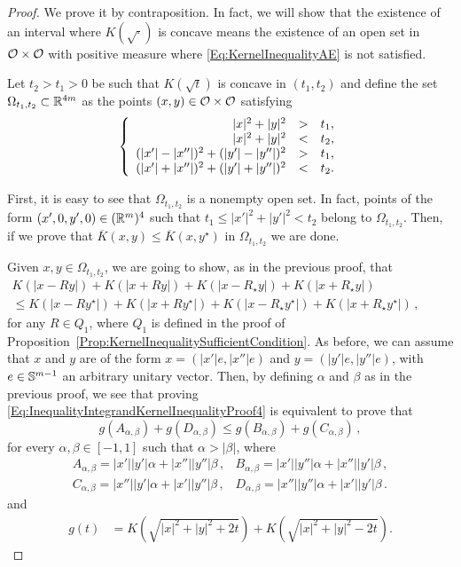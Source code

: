 \begin{proof}
We prove it by contraposition. In fact, we will show that the existence of an interval where $K(\sqrt{\cdot})$ is concave means the existence of an open set in $\mathcal{O} \times \mathcal{O}$ with positive measure where \eqref{Eq:KernelInequalityAE} is not satisfied.

Let $t_2>t_1>0$ be such that $K(\sqrt{t})$ is concave in $(t_1,t_2)$ and define the set $\Omega_{t_1,t_2}\subset \mathbb{R}^{4m}$ as the points $(x,y)\in \mathcal{O}\times \mathcal{O}$ satisfying
\begin{equation}
\label{eq:OmegaSetDefinition}
\left\{\begin{array}{rcll}
|x|^2+|y|^2&>&t_1,\\
|x|^2+|y|^2&<&t_2,\\
(|x'|-|x''|)^2+(|y'|-|y''|)^2&>&t_1,\\
(|x'|+|x''|)^2+(|y'|+|y''|)^2&<&t_2.
\end{array} \right.
\end{equation}

First, it is easy to see that $\Omega_{t_1,t_2}$ is a nonempty open set. In fact, points of the form $(x',0,y',0)\in (\mathbb{R}^m)^4$ such that $t_1\leq |x'|^2+|y'|^2<t_2$ belong to $\Omega_{t_1,t_2}$. Then, if we prove that $\overline{K}(x,y) \leq \overline{K}(x, y^\star)$ in $\Omega_{t_1,t_2}$ we are done.

Given $x,y\in \Omega_{t_1,t_2}$, we are going to show, as in the previous proof, that
\begin{equation}
\label{Eq:InequalityIntegrandKernelInequalityProof4}
\begin{split}
K(|x - R y|) + K(|x + R y|) + K(|x - R_\star y|) + K(|x + R_\star y|)
\quad \quad \quad \quad \quad \quad \quad \quad
\\
\leq
K(|x - R y^\star|) + K(|x + R y^\star|)+K(|x - R_\star y^\star|) + K(|x + R_\star y^\star|)\,,
\end{split}
\end{equation}
for any $R\in Q_1$, where $Q_1$ is defined in the proof of Proposition~\ref{Prop:KernelInequalitySufficientCondition}. As before, we can assume that $x$ and $y$ are of the form $x = (|x'|e, |x''|e)$ and $y = (|y'|e, |y''|e)$, with $e \in \mathbb{S}^{m-1}$ an arbitrary unitary vector. Then, by defining $\alpha$ and $\beta$ as in the previous proof, we see that proving \eqref{Eq:InequalityIntegrandKernelInequalityProof4} is equivalent to prove that
\begin{equation}
\label{Eq:InequalityIntegrandKernelInequalityProof5}
g(A_{\alpha,\beta}) + g(D_{\alpha,\beta}) \leq g(B_{\alpha,\beta}) + g(C_{\alpha,\beta})\,,
\end{equation}
for every $\alpha, \beta \in [-1,1]$ such that $\alpha>|\beta|$, where
$$
\begin{array}{cc}
A_{\alpha,\beta} = |x'||y'|  \alpha + |x''||y''|\beta \,, &
B_{\alpha,\beta} = |x'||y''| \alpha + |x''||y'| \beta \,, \\
C_{\alpha,\beta} = |x''||y'| \alpha + |x'||y''| \beta \,, &
D_{\alpha,\beta} = |x''||y''|\alpha + |x'||y'|  \beta \,.
\end{array}
$$
and
\begin{align*}
g(t) &= K\left( \sqrt{|x|^2+|y|^2+2t} \right) + K\left( \sqrt{|x|^2+|y|^2-2t} \right).
\end{align*}


\end{proof}
